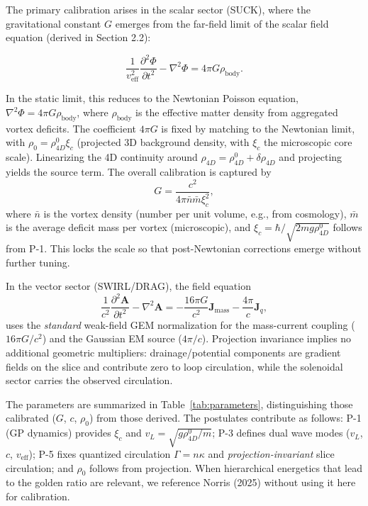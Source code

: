 The primary calibration arises in the scalar sector (SUCK), where the gravitational constant $G$ emerges from the far-field limit of the scalar field equation (derived in Section 2.2):

\begin{equation}
\frac{1}{v_{\text{eff}}^2} \frac{\partial^2 \Phi}{\partial t^2} - \nabla^2 \Phi = 4\pi G \rho_{\text{body}}.
\end{equation}

In the static limit, this reduces to the Newtonian Poisson equation, $\nabla^2 \Phi = 4\pi G \rho_{\text{body}}$, where $\rho_{\text{body}}$ is the effective matter density from aggregated vortex deficits. The coefficient $4\pi G$ is fixed by matching to the Newtonian limit, with $\rho_0 = \rho_{4D}^0 \xi_c$ (projected 3D background density, with $\xi_c$ the microscopic core scale). Linearizing the 4D continuity around $\rho_{4D} = \rho_{4D}^0 + \delta \rho_{4D}$ and projecting yields the source term. The overall calibration is captured by
\begin{equation}
G = \frac{c^2}{4\pi \bar{n} \bar{m} \xi_c^2},
\end{equation}
where $\bar{n}$ is the vortex density (number per unit volume, e.g., from cosmology), $\bar{m}$ is the average deficit mass per vortex (microscopic), and $\xi_c=\hbar/\sqrt{2 m g \rho_{4D}^0}$ follows from P-1. This locks the scale so that post-Newtonian corrections emerge without further tuning.

In the vector sector (SWIRL/DRAG), the field equation
\begin{equation}
\frac{1}{c^2} \frac{\partial^2 \mathbf{A}}{\partial t^2} - \nabla^2 \mathbf{A} = -\frac{16\pi G}{c^2} \mathbf{J}_{\text{mass}} - \frac{4\pi}{c} \mathbf{J}_q,
\end{equation}
uses the \emph{standard} weak-field GEM normalization for the mass-current coupling ($16\pi G/c^2$) and the Gaussian EM source ($4\pi/c$). Projection invariance implies no additional geometric multipliers: drainage/potential components are gradient fields on the slice and contribute zero to loop circulation, while the solenoidal sector carries the observed circulation.

The parameters are summarized in Table~\ref{tab:parameters}, distinguishing those calibrated ($G$, $c$, $\rho_0$) from those derived. The postulates contribute as follows: P-1 (GP dynamics) provides $\xi_c$ and $v_L = \sqrt{g \rho_{4D}^0 / m}$; P-3 defines dual wave modes ($v_L$, $c$, $v_{\text{eff}}$); P-5 fixes quantized circulation $\Gamma = n \kappa$ and \emph{projection-invariant} slice circulation; and $\rho_0$ follows from projection. When hierarchical energetics that lead to the golden ratio are relevant, we reference Norris (2025) \cite{Norris2025GoldenRatio} without using it here for calibration.

